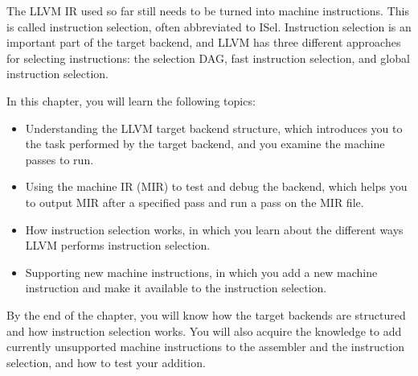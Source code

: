 The LLVM IR used so far still needs to be turned into machine instructions. This is called instruction selection, often abbreviated to ISel. Instruction selection is an important part of the target backend, and LLVM has three different approaches for selecting instructions: the selection DAG, fast instruction selection, and global instruction selection.\par

In this chapter, you will learn the following topics:\par

\begin{itemize}
\item Understanding the LLVM target backend structure, which introduces you to the task performed by the target backend, and you examine the machine passes to run.
\item Using the machine IR (MIR) to test and debug the backend, which helps you to output MIR after a specified pass and run a pass on the MIR file.
\item How instruction selection works, in which you learn about the different ways LLVM performs instruction selection.
\item Supporting new machine instructions, in which you add a new machine instruction and make it available to the instruction selection.
\end{itemize}

By the end of the chapter, you will know how the target backends are structured and how instruction selection works. You will also acquire the knowledge to add currently unsupported machine instructions to the assembler and the instruction selection, and how to test your addition.\par
















